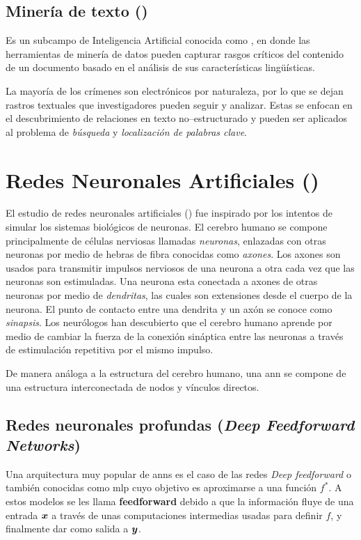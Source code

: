 \subsection{Minería de texto ()} \label{subsec:NLP}
Es un subcampo de Inteligencia Artificial conocida como , en donde las herramientas de minería de datos pueden capturar rasgos críticos del contenido de un documento basado en el análisis de sus características lingüísticas.

La mayoría de los crímenes son electrónicos por naturaleza, por lo que se dejan rastros textuales que investigadores pueden seguir y analizar. Estas se enfocan en el descubrimiento de relaciones en texto no--estructurado y pueden ser aplicados al problema de \emph{búsqueda} y \emph{localización de palabras clave}.


\section{Redes Neuronales Artificiales ()} \label{sec:ANN}
El estudio de redes neuronales artificiales () fue inspirado por los intentos de simular los sistemas biológicos de neuronas. El cerebro humano se compone principalmente de células nerviosas llamadas \emph{neuronas}, enlazadas con otras neuronas por medio de hebras de fibra conocidas como \emph{axones}. Los axones son usados para transmitir impulsos nerviosos de una neurona a otra cada vez que las neuronas son estimuladas. Una neurona esta conectada a axones de otras neuronas por medio de \emph{dendritas}, las cuales son extensiones desde el cuerpo de la neurona. El punto de contacto entre una dendrita y un axón se conoce como \emph{sinapsis}. Los neurólogos han descubierto que el cerebro humano aprende por medio de cambiar la fuerza de la conexión sináptica entre las neuronas a través de estimulación repetitiva por el mismo impulso.

De manera análoga a la estructura del cerebro humano, una \gls{ann} se compone de una estructura interconectada de nodos y vínculos directos.

\subsection{Redes neuronales profundas (\textsl{Deep Feedforward Networks})}
Una arquitectura muy popular de \glspl{ann} es el caso de las redes \textsl{Deep feedforward} o también conocidas como \gls{mlp} cuyo objetivo es aproximarse a una función $f^{\ast}$. A estos modelos se les llama \textbf{feedforward} debido a que la información fluye de una entrada ${\bm{x}}$ a través de unas computaciones intermedias usadas para definir $f$, y finalmente dar como salida a ${\bm{y}}$.

